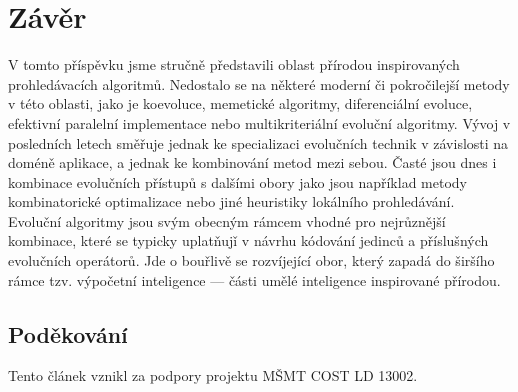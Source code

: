 \documentclass[12pt,fleqn,a4paper,proc]{article}
\begin{document}
\section{Závěr}

V tomto příspěvku jsme stručně představili oblast přírodou inspirovaných prohledávacích algoritmů. Nedostalo se na některé moderní či pokročilejší metody v této oblasti, jako je koevoluce, memetické algoritmy, diferenciální evoluce, efektivní paralelní implementace nebo multikriteriální evoluční algoritmy. Vývoj v posledních letech směřuje jednak ke specializaci evolučních technik v závislosti na doméně aplikace, a jednak ke kombinování metod mezi sebou. Časté jsou dnes i kombinace evolučních přístupů s dalšími obory jako jsou například metody kombinatorické optimalizace nebo jiné heuristiky lokálního prohledávání. Evoluční algoritmy jsou svým obecným rámcem vhodné pro nejrůznější kombinace, které se typicky uplatňujǐ v návrhu kódování jedinců a příslušných evolučních operátorů. Jde o bouřlivě se rozvíjející obor, který zapadá do širšího rámce tzv. výpočetní inteligence --- části umělé inteligence inspirované přírodou. 

\subsection*{Poděkování}
Tento článek vznikl za podpory projektu MŠMT COST LD 13002.
\end{document}
